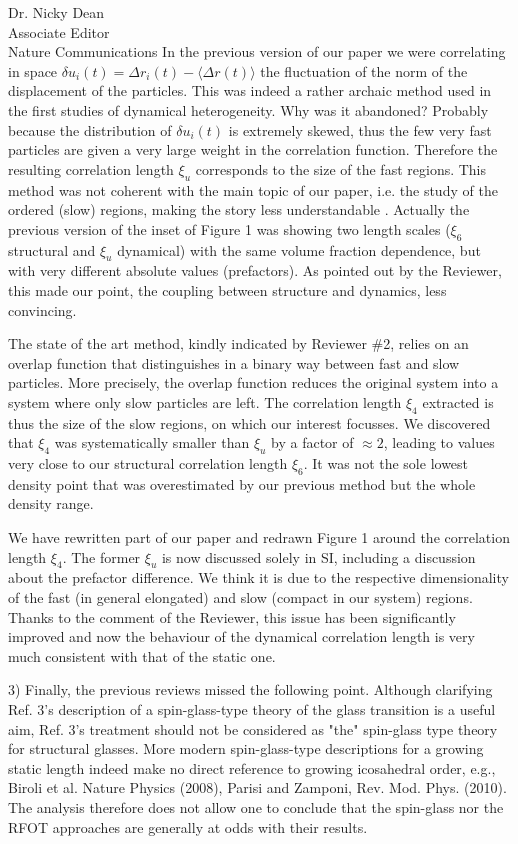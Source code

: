 \documentclass[a4paper, rebuttal, parskip=true, firsthead=false, fromemail=true, foldmarks=false]{scrlttr2}
\begin{document}
\begin{letter}{Dr. Nicky Dean\\
Associate Editor\\
Nature Communications}
In the previous version of our paper we were correlating in space $\delta u_i(t) = \Delta r_i(t)-\langle\Delta r(t)\rangle$ the fluctuation of the norm of the displacement of the particles. This was indeed a rather archaic method used in the first studies of dynamical heterogeneity. Why was it abandoned? Probably because the distribution of $\delta u_i(t)$ is extremely skewed, thus the few very fast particles are given a very large weight in the correlation function. Therefore the resulting correlation length $\xi_u$ corresponds to the size of the fast regions. This method was not coherent with the main topic of our paper, i.e. the study of the ordered (slow) regions, making the story less understandable%
. Actually the previous version of the inset of Figure 1 was showing two length scales ($\xi_6$ structural and $\xi_u$ dynamical) with the same volume fraction dependence, but with very different absolute values (prefactors). As pointed out by the Reviewer, this made our point, the coupling between structure and dynamics, less convincing.

The state of the art method, kindly indicated by Reviewer \#2, relies on an overlap function that distinguishes in a binary way between fast and slow particles. More precisely, the overlap function reduces the original system into a system where only slow particles are left. The correlation length $\xi_4$ extracted is thus the size of the slow regions, on which our interest focusses. We discovered that $\xi_4$ was systematically smaller than $\xi_u$ by a factor of $\approx 2$, leading to values very close to our structural correlation length $\xi_6$. It was not the sole lowest density point that was overestimated by our previous method but the whole density range.

We have rewritten part of our paper and redrawn Figure 1 around the correlation length $\xi_4$. The former $\xi_u$ is now discussed solely in SI, including a discussion about the prefactor difference. We think it is due to the respective dimensionality of the fast (in general elongated) and slow (compact in our system) regions.
Thanks to the comment of the Reviewer, this issue has been significantly improved and now the behaviour of the dynamical correlation length is very much consistent with that 
of the static one. 

\begin{quotationi}
3) Finally, the previous reviews missed the following point. Although clarifying Ref. 3's description of a spin-glass-type theory of the glass transition is a useful aim, Ref. 3's treatment should not be considered as "the" spin-glass type theory for structural glasses. More modern spin-glass-type descriptions for a growing static length indeed make no direct reference to growing icosahedral order, e.g., Biroli et al. Nature Physics (2008), Parisi and Zamponi, Rev. Mod. Phys. (2010). The analysis therefore does not allow one to conclude that the spin-glass nor the RFOT approaches are generally at odds with their results.
\end{quotationi}


\end{letter}
\end{document}
